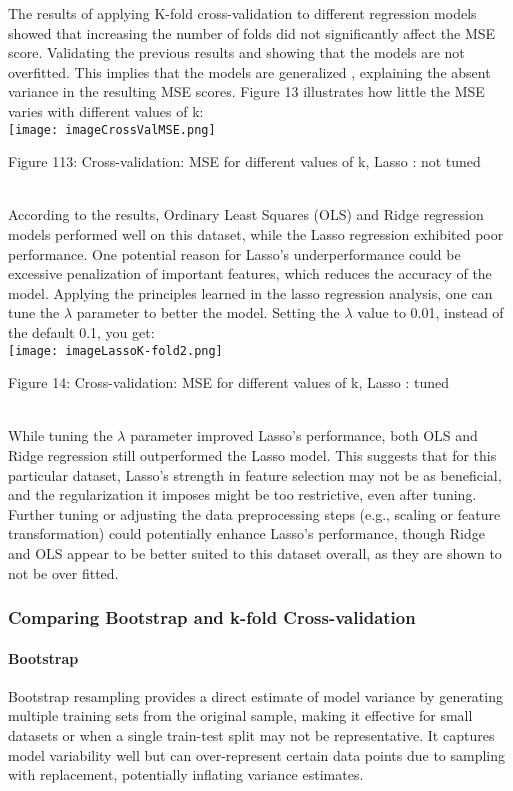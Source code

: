 \documentclass{article}
\begin{document}
\begin{enumerate}
The results of applying K-fold cross-validation to different regression models showed that increasing the number of folds did not significantly affect the MSE score. Validating the previous results and showing that the models are not overfitted. This implies that the models are generalized , explaining the absent variance in the resulting MSE scores. Figure 13 illustrates how little the MSE varies with different values of k:\\

\texttt{[image: imageCrossValMSE.png]}
\caption{Figure 113: Cross-validation: MSE for different values of k, Lasso : not tuned}
\label{fig:enter-label}\\

According to the results, Ordinary Least Squares (OLS) and Ridge regression models performed well on this dataset, while the Lasso regression exhibited poor performance. One potential reason for Lasso’s underperformance could be excessive penalization of important features, which reduces the accuracy of the model. Applying the principles learned in the lasso regression analysis, one can tune the \(\lambda\) parameter to better the model. Setting the \(\lambda\) value to 0.01, instead of the default 0.1, you get:\\

\texttt{[image: imageLassoK-fold2.png]}
\caption{Figure 14: Cross-validation: MSE for different values of k, Lasso : tuned}
\label{fig:enter-label}\\

While tuning the \(\lambda\) parameter improved Lasso’s performance, both OLS and Ridge regression still outperformed the Lasso model. This suggests that for this particular dataset, Lasso’s strength in feature selection may not be as beneficial, and the regularization it imposes might be too restrictive, even after tuning. Further tuning or adjusting the data preprocessing steps (e.g., scaling or feature transformation) could potentially enhance Lasso’s performance, though Ridge and OLS appear to be better suited to this dataset overall, as they are shown to not be over fitted.

\subsubsection{Comparing Bootstrap and k-fold Cross-validation}

\paragraph{Bootstrap}
Bootstrap resampling provides a direct estimate of model variance by generating multiple training sets from the original sample, making it effective for small datasets or when a single train-test split may not be representative. It captures model variability well but can over-represent certain data points due to sampling with replacement, potentially inflating variance estimates.


\end{enumerate}
\end{document}
